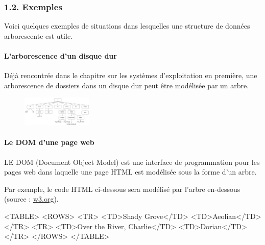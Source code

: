 \documentclass[
  a4paper,
  DIV=11,
  numbers=noendperiod]{scrartcl}
\let\oldparagraph\paragraph
\renewcommand{\paragraph}[1]{\oldparagraph{#1}\mbox{}}
\newenvironment{Shaded}{\begin{snugshade}}{\end{snugshade}}
\newcommand{\KeywordTok}[1]{\textcolor[rgb]{0.00,0.23,0.31}{#1}}
\newcommand{\NormalTok}[1]{\textcolor[rgb]{0.00,0.23,0.31}{#1}}
\begin{document}
\hypertarget{exemples}{%
\subsubsection{1.2. Exemples}\label{exemples}}

Voici quelques exemples de situations dans lesquelles une structure de
données arborescente est utile.

\hypertarget{larborescence-dun-disque-dur}{%
\paragraph{L'arborescence d'un disque
dur}\label{larborescence-dun-disque-dur}}

Déjà rencontrée dans le chapitre sur les systèmes d'exploitation en
première, une arborescence de dossiers dans un disque dur peut être
modélisée par un arbre.

\begin{figure}

{\centering \includegraphics[width=0.3\textwidth,height=\textheight]{arborescence.png}

}

\end{figure}

\hypertarget{le-dom-dune-page-web}{%
\paragraph{Le DOM d'une page web}\label{le-dom-dune-page-web}}

LE DOM (Document Object Model) est une interface de programmation pour
les pages web dans laquelle une page HTML est modélisée sous la forme
d'un arbre.

Par exemple, le code HTML ci-dessous sera modélisé par l'arbre
en-dessous (source :
\href{https://www.w3.org/TR/WD-DOM/introduction.html}{w3.org}).

\begin{Shaded}
\begin{Highlighting}[]
\KeywordTok{\textless{}TABLE\textgreater{}}
    \KeywordTok{\textless{}ROWS\textgreater{}} 
      \KeywordTok{\textless{}TR\textgreater{}} 
        \KeywordTok{\textless{}TD\textgreater{}}\NormalTok{Shady Grove}\KeywordTok{\textless{}/TD\textgreater{}}
        \KeywordTok{\textless{}TD\textgreater{}}\NormalTok{Aeolian}\KeywordTok{\textless{}/TD\textgreater{}} 
      \KeywordTok{\textless{}/TR\textgreater{}} 
      \KeywordTok{\textless{}TR\textgreater{}}
        \KeywordTok{\textless{}TD\textgreater{}}\NormalTok{Over the River, Charlie}\KeywordTok{\textless{}/TD\textgreater{}}
        \KeywordTok{\textless{}TD\textgreater{}}\NormalTok{Dorian}\KeywordTok{\textless{}/TD\textgreater{}} 
      \KeywordTok{\textless{}/TR\textgreater{}} 
    \KeywordTok{\textless{}/ROWS\textgreater{}}
\KeywordTok{\textless{}/TABLE\textgreater{}}
\end{Highlighting}
\end{Shaded}
\end{document}
